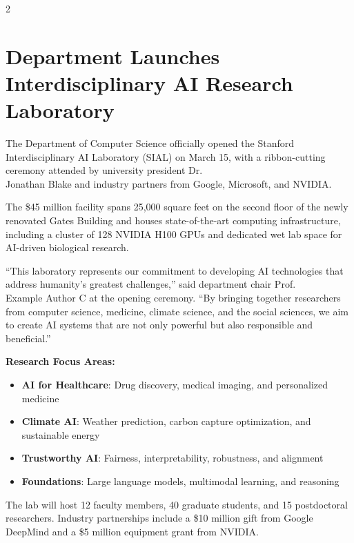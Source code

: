 \documentclass[10pt,a4paper]{article}
\begin{document}
\begin{multicols}{2}

\section{Department Launches Interdisciplinary AI Research Laboratory}

The Department of Computer Science officially opened the Stanford Interdisciplinary AI Laboratory (SIAL) on March 15, with a ribbon-cutting ceremony attended by university president Dr.\\ Jonathan Blake and industry partners from Google, Microsoft, and NVIDIA.

The \$45 million facility spans 25,000 square feet on the second floor of the newly renovated Gates Building and houses state-of-the-art computing infrastructure, including a cluster of 128 NVIDIA H100 GPUs and dedicated wet lab space for AI-driven biological research.

``This laboratory represents our commitment to developing AI technologies that address humanity's greatest challenges,'' said department chair Prof.\\ Example Author C at the opening ceremony. ``By bringing together researchers from computer science, medicine, climate science, and the social sciences, we aim to create AI systems that are not only powerful but also responsible and beneficial.''

\textbf{Research Focus Areas:}
\begin{itemize}[leftmargin=1.2em, nosep, itemsep=2pt]
  \item \textbf{AI for Healthcare}: Drug discovery, medical imaging, and personalized medicine
  \item \textbf{Climate AI}: Weather prediction, carbon capture optimization, and sustainable energy
  \item \textbf{Trustworthy AI}: Fairness, interpretability, robustness, and alignment
  \item \textbf{Foundations}: Large language models, multimodal learning, and reasoning
\end{itemize}

The lab will host 12 faculty members, 40 graduate students, and 15 postdoctoral researchers. Industry partnerships include a \$10 million gift from Google DeepMind and a \$5 million equipment grant from NVIDIA.


\end{multicols}
\end{document}

